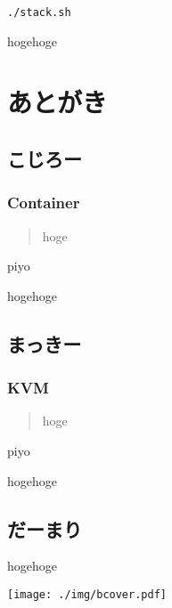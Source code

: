 \documentclass[9pt,b5paper,tombo]{jsbook}
\begin{document}
\begin{lstlisting}
./stack.sh
\end{lstlisting}

hogehoge

\chapter{あとがき}

\section{こじろー}

\subsection{Container}

\begin{quote}
hoge
\end{quote}

\begin{flushright}
piyo
\end{flushright}

hogehoge

\section{まっきー}

\subsection{KVM}

\begin{quote}
hoge
\end{quote}

\begin{flushright}
piyo
\end{flushright}

hogehoge

\section{だーまり}

hogehoge

\newpage


\enlargethispage{\paperwidth}
\thispagestyle{empty}
\vspace*{-1truein}
\vspace*{-\topmargin}
\vspace*{-\headheight}
\vspace*{-\headsep}
\vspace*{-\topskip}
\noindent\hspace*{-1in}\hspace*{-\oddsidemargin}
\texttt{[image: ./img/bcover.pdf]}
\end{document}
